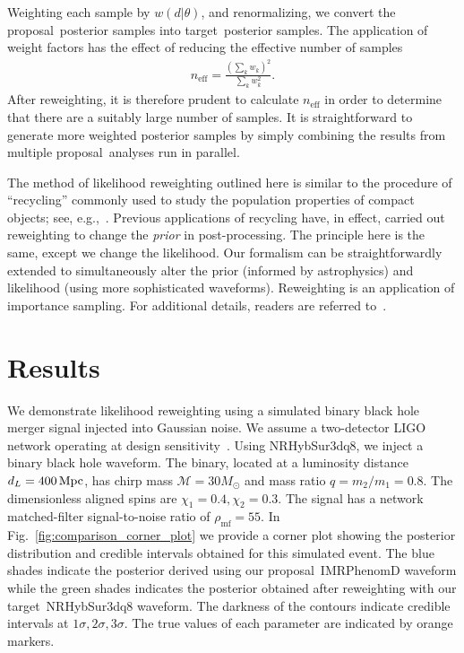 \documentclass[prd,superscriptaddress,twocolumn,nopreprintnumbers,floatfix,longbibliography]{revtex4}
\newcommand{\sur}{{\sc NRHybSur3dq8}\xspace}
\newcommand{\proposal}{proposal}
\newcommand{\target}{target}
\newcommand{\ep}[1]{\textcolor{red}{[EP: #1]}}
\begin{document}
Weighting each sample by $w(d|\theta)$, and renormalizing, we convert the \proposal\ posterior samples into \target\ posterior samples.
The application of weight factors has the effect of reducing the effective number of samples~\cite{Kish,Elvira}
\begin{align}
    n_\text{eff} = \frac{\left(\sum_k w_k\right)^2}{\sum_k w_k^2} .
\end{align}
After reweighting, it is therefore prudent to calculate $n_\text{eff}$ in order to determine that there are a suitably large number of samples.
It is straightforward to generate more weighted posterior samples by simply combining the results from multiple \proposal\ analyses run in parallel.

The method of likelihood reweighting outlined here is similar to the procedure of ``recycling'' commonly used to study the population properties of compact objects; see, e.g.,~\cite{o2pop,intro}.
Previous applications of recycling have, in effect, carried out reweighting to change the {\em prior} in post-processing.
The principle here is the same, except we change the likelihood.
Our formalism can be straightforwardly extended to simultaneously alter the prior (informed by astrophysics) and likelihood (using more sophisticated waveforms).
Reweighting is an application of importance sampling.
For additional details, readers are referred to~\cite{Robert&Casella,Liu}.


\section{Results}\label{results}
We demonstrate likelihood reweighting  using a simulated binary black hole merger signal injected into Gaussian noise.
We assume a two-detector LIGO network operating at design sensitivity~\cite{aligo}.
Using \sur, we inject a binary black hole waveform.
The binary, located at a luminosity distance $d_L=\unit[400]{Mpc}$, has chirp mass $\mathcal{M}=30 M_\odot$ and mass ratio $q=m_2/m_1=0.8$.
The dimensionless aligned spins are $\chi_1=0.4,\chi_2=0.3$.
The signal has a network matched-filter signal-to-noise ratio of $\rho_\text{mf}=55$.
In Fig.~\ref{fig:comparison_corner_plot} we provide a corner plot showing the posterior distribution and credible intervals obtained for this simulated event.
The blue shades indicate the posterior derived using our \proposal\ {\sc IMRPhenomD} waveform while the green shades indicates the posterior obtained after reweighting with our \target\ \sur waveform.
The darkness of the contours indicate credible intervals at $1\sigma,2\sigma,3\sigma$.
The true values of each parameter are indicated by orange markers.
\end{document}

